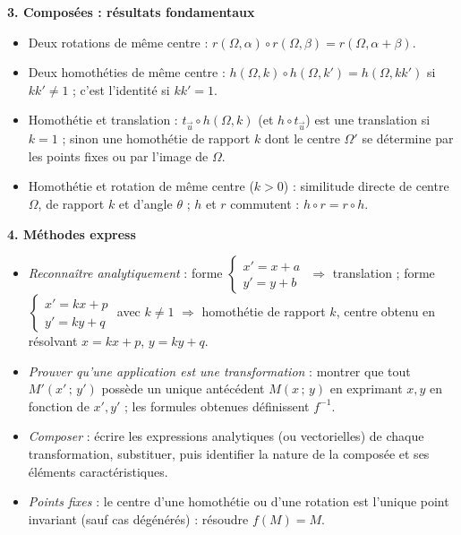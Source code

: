 \documentclass[11pt]{article}
\newcommand{\cle}[1]{{\popxbold\color{popdark}#1}}
\begin{document}
\begin{bilan}
\textbf{3. Compos\'ees : r\'esultats fondamentaux}
\begin{itemize}
  \item Deux \cle{rotations de m\^eme centre} : $r(\Omega,\alpha)\circ r(\Omega,\beta)=r(\Omega,\alpha+\beta)$.
  \item Deux \cle{homoth\'eties de m\^eme centre} : $h(\Omega,k)\circ h(\Omega,k')=h(\Omega,kk')$ si $kk'\neq 1$ ; c'est l'\cle{identit\'e} si $kk'=1$.
  \item \cle{Homoth\'etie et translation} : $t_{\vec{u}}\circ h(\Omega,k)$ (et $h\circ t_{\vec{u}}$) est une translation si $k=1$ ; sinon une \cle{homoth\'etie de rapport $k$} dont le centre $\Omega'$ se d\'etermine par les points fixes ou par l'image de $\Omega$.
  \item \cle{Homoth\'etie et rotation de m\^eme centre} ($k>0$) : similitude directe de centre $\Omega$, de rapport $k$ et d'angle $\theta$ ; $h$ et $r$ commutent : $h\circ r=r\circ h$.
\end{itemize}

\textbf{4. M\'ethodes express}
\begin{itemize}
  \item \emph{Reconna\^itre analytiquement} : forme $\begin{cases}x'=x+a\\ y'=y+b\end{cases}$ $\Rightarrow$ translation ; forme $\begin{cases}x'=kx+p\\ y'=ky+q\end{cases}$ avec $k\neq 1$ $\Rightarrow$ homoth\'etie de rapport $k$, centre obtenu en r\'esolvant $x=kx+p$, $y=ky+q$.
  \item \emph{Prouver qu'une application est une transformation} : montrer que tout $M'(x'\,;\,y')$ poss\`ede un unique ant\'ec\'edent $M(x\,;\,y)$ en exprimant $x,y$ en fonction de $x',y'$ ; les formules obtenues d\'efinissent $f^{-1}$.
  \item \emph{Composer} : \'ecrire les expressions analytiques (ou vectorielles) de chaque transformation, substituer, puis identifier la nature de la compos\'ee et ses \'el\'ements caract\'eristiques.
  \item \emph{Points fixes} : le centre d'une homoth\'etie ou d'une rotation est l'unique point invariant (sauf cas d\'eg\'en\'er\'es) : r\'esoudre $f(M)=M$.
\end{itemize}
\end{bilan}
\end{document}
